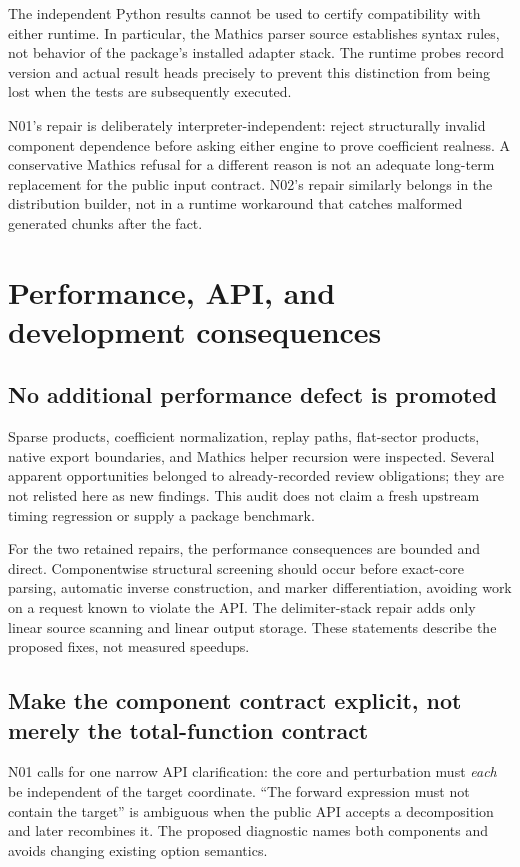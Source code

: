 \documentclass[11pt,letterpaper]{article}
\begin{document}
The independent Python results cannot be used to certify compatibility with either runtime. In particular, the Mathics parser source establishes syntax rules, not behavior of the package's installed adapter stack. The runtime probes record version and actual result heads precisely to prevent this distinction from being lost when the tests are subsequently executed.

N01's repair is deliberately interpreter-independent: reject structurally invalid component dependence before asking either engine to prove coefficient realness. A conservative Mathics refusal for a different reason is not an adequate long-term replacement for the public input contract. N02's repair similarly belongs in the distribution builder, not in a runtime workaround that catches malformed generated chunks after the fact.

\section{Performance, API, and development consequences}
\label{sec:development}

\subsection{No additional performance defect is promoted}
Sparse products, coefficient normalization, replay paths, flat-sector products, native export boundaries, and Mathics helper recursion were inspected. Several apparent opportunities belonged to already-recorded review obligations; they are not relisted here as new findings. This audit does not claim a fresh upstream timing regression or supply a package benchmark.

For the two retained repairs, the performance consequences are bounded and direct. Componentwise structural screening should occur before exact-core parsing, automatic inverse construction, and marker differentiation, avoiding work on a request known to violate the API. The delimiter-stack repair adds only linear source scanning and linear output storage. These statements describe the proposed fixes, not measured speedups.

\subsection{Make the component contract explicit, not merely the total-function contract}
N01 calls for one narrow API clarification: the core and perturbation must \emph{each} be independent of the target coordinate. ``The forward expression must not contain the target'' is ambiguous when the public API accepts a decomposition and later recombines it. The proposed diagnostic names both components and avoids changing existing option semantics.
\end{document}
